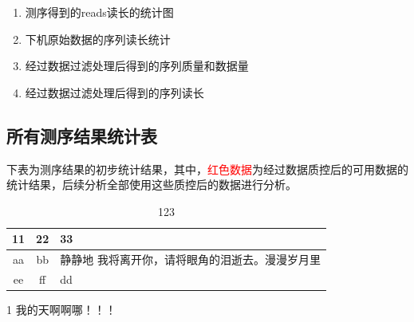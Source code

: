 \begin{enumerate}
    \renewcommand\theenumi{\alph{enumi}}
    \renewcommand\labelenumi{(\theenumi)}
      \item 测序得到的reads读长的统计图
      \item 下机原始数据的序列读长统计
      \item 经过数据过滤处理后得到的序列质量和数据量
      \item 经过数据过滤处理后得到的序列读长
\end{enumerate}





\subsection{所有测序结果统计表}
下表为测序结果的初步统计结果，其中，\textcolor{red}{红色数据}为经过数据质控后的可用数据的统计结果，后续分析全部使用这些质控后的数据进行分析。
\begin{table}[h]
    \caption{123}
        \begin{center}
            \begin{threeparttable}
                \begin{tabularx}{\textwidth}{cc|X}

                    \toprule
                    11&22&33\\
                    \midrule
                    aa&bb&静静地 \tnote{1} 我将离开你，请将眼角的泪逝去。漫漫岁月里\\

                    ee&ff&dd\\
                    \bottomrule

                \end{tabularx}
                \begin{tablenotes}

                    \footnotesize
                    \item[1] 我的天啊啊哪！！！
                \end{tablenotes}
            \end{threeparttable}
        \end{center}
\end{table}


